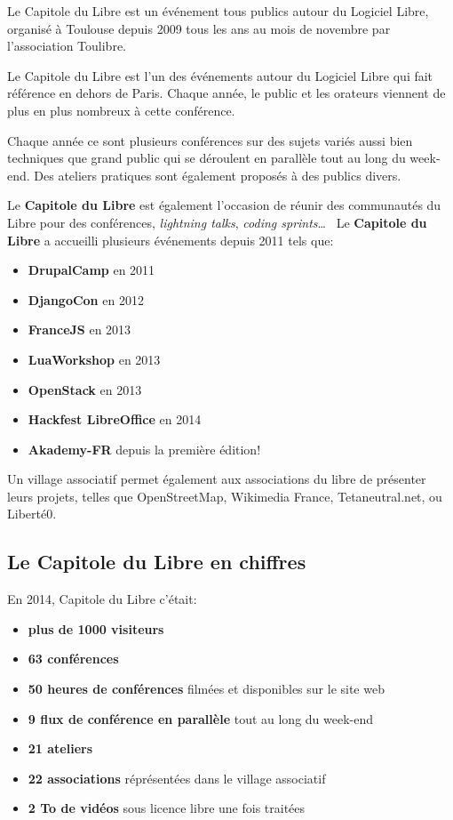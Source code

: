 
Le Capitole du Libre est un événement tous publics autour du Logiciel Libre,
 organisé à Toulouse depuis 2009 tous les ans au mois de novembre
 par l'association Toulibre.

Le Capitole du Libre est l'un des événements autour du Logiciel Libre
 qui fait référence en dehors de Paris.
 Chaque année, le public et les orateurs viennent de plus en plus nombreux
 à cette conférence. 

Chaque année ce sont plusieurs conférences sur des sujets variés
 aussi bien techniques que grand public qui se déroulent en parallèle
 tout au long du week-end.
 Des ateliers pratiques sont également proposés à des publics divers.

\Separateur

Le \textbf{Capitole du Libre} est également l'occasion de réunir des 
communautés du Libre pour des conférences, \textit{lightning talks}, 
\textit{coding sprints}\dots ~ Le \textbf{Capitole du Libre} a 
accueilli plusieurs événements depuis 2011 tels que:
\begin{itemize}[label=$\bullet$]
\item \textbf{DrupalCamp} en 2011
\item \textbf{DjangoCon} en 2012
\item \textbf{FranceJS} en 2013
\item \textbf{LuaWorkshop} en 2013
\item \textbf{OpenStack} en 2013
\item \textbf{Hackfest LibreOffice}  en 2014
\item \textbf{Akademy-FR} depuis la première édition!
\end{itemize}

\Separateur

Un village associatif permet également aux associations du libre de
 présenter leurs projets, telles que OpenStreetMap, Wikimedia France, 
Tetaneutral.net, ou Liberté0.

\subsection{Le Capitole du Libre en chiffres}

En 2014, Capitole du Libre c'était:
\begin{itemize}[label=$\bullet$]
\item \textbf{plus de 1000 visiteurs}
\item \textbf{63 conférences}
\item \textbf{50 heures de conférences} filmées et disponibles sur le site web
\item \textbf{9 flux de conférence en parallèle} tout au long du week-end
\item \textbf{21 ateliers}
\item \textbf{22 associations} réprésentées dans le village associatif
\item \textbf{2 To de vidéos} sous licence libre une fois traitées
\end{itemize}

